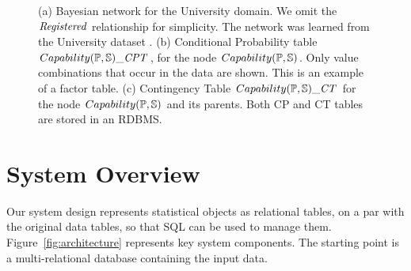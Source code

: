 \documentclass{article} %
\begin{document}
\begin{figure}[htbp] %
 \centering
{} 
\caption{ (a) Bayesian network for the University domain. We omit the $\it{Registered}$ relationship for simplicity. The network was learned from the University dataset \cite{bib:bbsite}.
(b) Conditional Probability table $Capability(\P,\S)\_\cptable$, for the node $Capability(\P,\S)$. Only value combinations that occur in the data are shown. This is an example of a factor table. (c) Contingency Table $Capability(\P,\S)\_\cttable$ for the node $Capability(\P,\S)$ and its parents. Both CP and CT tables are stored in an RDBMS.}
 \label{fig:pbn}
\end{figure}




\section{System Overview} 

Our system design represents statistical objects as  relational tables, on a par with the original data tables, so that SQL can be used  to manage them. 
Figure~\ref{fig:architecture} represents key system components. The starting point is a multi-relational database containing the input data. 
 
\end{document}

